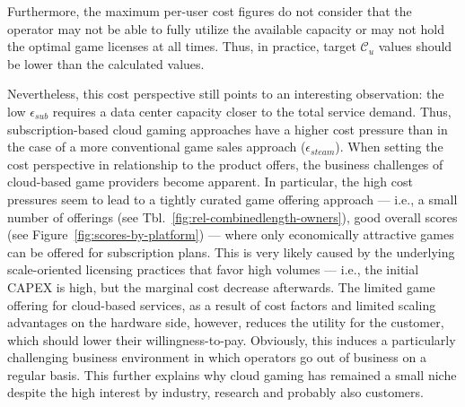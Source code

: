 Furthermore, the maximum per-user cost figures do not consider that the operator may not be able to fully utilize the available capacity or may not hold the optimal game licenses at all times. Thus, in practice, target $\mathcal{C}_{u}$ values should be lower than the calculated values.

Nevertheless, this cost perspective still points to an interesting observation: the low $\epsilon_{sub}$ requires a data center capacity closer to the total service demand. Thus, subscription-based cloud gaming approaches have a higher cost pressure than in the case of a more conventional game sales approach ($\epsilon_{steam}$). When setting the cost perspective in relationship to the product offers, the business challenges of cloud-based game providers become apparent. In particular, the high cost pressures seem to lead to a tightly curated game offering approach --- i.e., a small number of offerings (see Tbl.~\ref{fig:rel-combinedlength-owners}), good overall scores (see Figure~\ref{fig:scores-by-platform}) --- where only economically attractive games can be offered for subscription plans. This is very likely caused by the underlying scale-oriented licensing practices that favor high volumes --- i.e., the initial \gls{CAPEX} is high, but the marginal cost decrease afterwards. The limited game offering for cloud-based services, as a result of cost factors and limited scaling advantages on the hardware side, however, reduces the utility for the customer, which should lower their willingness-to-pay. Obviously, this induces a particularly challenging business environment in which operators go out of business on a regular basis. This further explains why cloud gaming has remained a small niche despite the high interest by industry, research and probably also customers.











